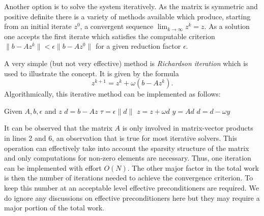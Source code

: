 \documentclass[a4paper,12pt]{article}
\begin{document}
Another option is to solve the system iteratively. As the matrix is symmetric and positive
definite there is a variety of methods available which produce, starting from an
initial iterate $z^0$, a convergent sequence $\lim_{k\to\infty} z^k = z$. As a solution
one accepts the first iterate which satisfies the computable criterion
$\|b-Az^k\| < \epsilon \|b-Az^0\|$ for a given reduction factor $\epsilon$.

A very simple (but not very effective) method is {\em Richardson iteration} which is
used to illustrate the concept. It is given by the formula
$$ z^{k+1} = z^{k} + \omega (b-Az^{k}).$$
Algorithmically, this iterative method can be implemented as follows:
\begin{algorithmic}[1]
\State Given $A, b, \epsilon$ and $z$ 
\State $d = b-Az$ 
\State $\tau = \epsilon \|d\|$ 
 
\State $z = z + \omega d$ 
\State $y = A d$ 
\State $d = d - \omega y$ 
\EndWhile
\end{algorithmic}
It can be observed that the matrix $A$ is only involved in matrix-vector
products in lines 2 and 6, an observation that is true for most iterative
solvers. This operation can effectively take into account the sparsity structure
of the matrix and only computations for non-zero elements are necessary.
Thus, one iteration can be implemented with effort $O(N)$. 
The other major factor in the total work is then the number
of iterations needed to achieve the convergence criterion. To keep this
number at an acceptable level effective preconditioners are required.
We do ignore any discussions on effective preconditioners here but they may require 
a major portion of the total work.
\end{document}

